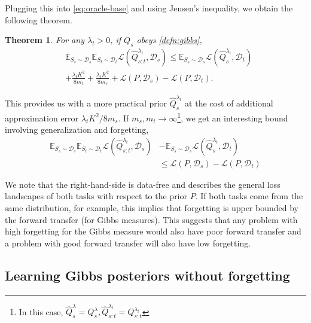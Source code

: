 \documentclass{article}
\theoremstyle{plain}
\newtheorem{theorem}{Theorem}[section]
\theoremstyle{definition}
\theoremstyle{remark}
\begin{document}
Plugging this into \eqref{eq:oracle-base} and using Jensen's inequality, we obtain the following theorem.

\begin{theorem}
For any $\lambda_t>0$, if $Q_s$ obeys \eqref{defn:gibbs}, 
%
\begin{equation}
\begin{split}
&\mathbb{E}_{S_s\sim \mathcal{D}_s}\mathbb{E}_{S_t\sim \mathcal{D}_t}\mathcal{L}( \hat{Q}^{\lambda_t}_{s:t},\mathcal{D}_s)\leq \mathbb{E}_{S_s\sim \mathcal{D}_s}\mathcal{L}(\hat{Q}^{\lambda_t}_s,\mathcal{D}_t)\\&+\frac{\lambda_t K^2}{8m_t}+\frac{\lambda_t K^2}{8m_s}+\mathcal{L}(P,\mathcal{D}_s)-\mathcal{L}(P,\mathcal{D}_t).
\end{split}
\end{equation}
\end{theorem}

This provides us with a more practical prior $\hat{Q}^{\lambda_t}_s$ at the cost of additional approximation error $\lambda_t K^2/8m_s$.
If $m_s,m_t\rightarrow \infty$\footnote{In this case, $\hat{Q}^\lambda_s=Q^\lambda_s, \hat{Q}^{\lambda_t}_{s:t}=Q^{\lambda_t}_{s:t}$}, we get an interesting bound involving generalization and forgetting,
%
\begin{equation*}
\begin{split}
\mathbb{E}_{S_s\sim \mathcal{D}_s}\mathbb{E}_{S_t\sim \mathcal{D}_t}\mathcal{L}( \hat{Q}^{\lambda_t}_{s:t},\mathcal{D}_s)&-\mathbb{E}_{S_s\sim \mathcal{D}_s}\mathcal{L}(\hat{Q}^{\lambda_t}_s,\mathcal{D}_t)\\&\leq \mathcal{L}(P,\mathcal{D}_s)-\mathcal{L}(P,\mathcal{D}_t)
\end{split}
\end{equation*}

We note that the right-hand-side is data-free and describes the general loss landscapes of both tasks with respect to the prior $P$. If both tasks come from the same distribution, for example, this implies that forgetting is upper bounded by the forward transfer (for Gibbs measures).
This suggests that any problem with high forgetting for the Gibbs measure would also have poor forward transfer and a problem with good forward transfer will also have low forgetting. 

\subsection{Learning Gibbs posteriors without forgetting}
\end{document}
